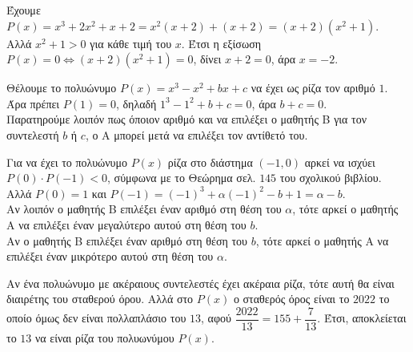 \begin{alist}
\item Έχουμε $P(x) = x^3 + 2x^2 + x + 2 = x^2(x + 2) + (x + 2) = (x + 2)(x^2 + 1)$. \\
Αλλά $x^2 + 1 > 0$ για κάθε τιμή του $x$. Έτσι η εξίσωση $P(x) = 0 \Leftrightarrow (x + 2)(x^2 + 1) = 0$, δίνει $x + 2 = 0$, άρα $x = -2$.
\item Θέλουμε το πολυώνυμο $P(x) = x^3 - x^2 + bx + c$ να έχει ως ρίζα τον αριθμό $1$. \\
Άρα πρέπει $P(1) = 0$, δηλαδή $1^3 - 1^2 + b + c = 0$, άρα $b + c = 0$. \\
Παρατηρούμε λοιπόν πως όποιον αριθμό και να επιλέξει ο μαθητής Β για τον συντελεστή $b$ ή $c$, ο Α μπορεί μετά να επιλέξει τον αντίθετό του.
\item Για να έχει το πολυώνυμο $P(x)$ ρίζα στο διάστημα $(-1, 0)$ αρκεί να ισχύει \\
$P(0) \cdot P(-1) < 0$, σύμφωνα με το Θεώρημα σελ. $145$ του σχολικού βιβλίου. \\
Αλλά $P(0) = 1$ και $P(-1) = (-1)^3 + \alpha(-1)^2 - b + 1 = \alpha - b$. \\
Αν λοιπόν ο μαθητής Β επιλέξει έναν αριθμό στη θέση του $\alpha$, τότε αρκεί ο μαθητής Α να επιλέξει έναν μεγαλύτερο αυτού στη θέση του $b$. \\
Αν ο μαθητής Β επιλέξει έναν αριθμό στη θέση του $b$, τότε αρκεί ο μαθητής Α να επιλέξει έναν μικρότερο αυτού στη θέση του $\alpha$.
\item Αν ένα πολυώνυμο με ακέραιους συντελεστές έχει ακέραια ρίζα, τότε αυτή θα είναι διαιρέτης του σταθερού όρου. Αλλά στο $P(x)$ ο σταθερός όρος είναι το $2022$ το οποίο όμως δεν είναι πολλαπλάσιο του $13$, αφού $\dfrac{2022}{13} = 155 + \dfrac{7}{13}$. Έτσι, αποκλείεται το $13$ να είναι ρίζα του πολυωνύμου $P(x)$.
\end{alist}

